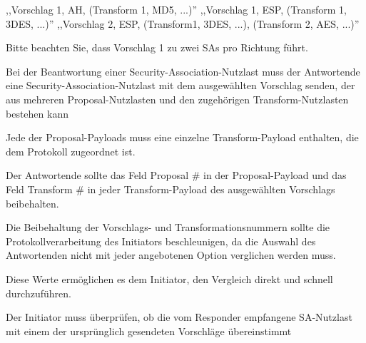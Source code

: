 \documentclass[a4paper]{article}
\begin{document}
\begin{multicols}{3}
\begin{itemize*}
\begin{itemize*}
                  \begin{itemize*}
                        \item ,,Vorschlag 1, AH, (Transform 1, MD5, ...)'' ,,Vorschlag 1, ESP, (Transform 1, 3DES, ...)'' ,,Vorschlag 2, ESP, (Transform1, 3DES, ...), (Transform 2, AES, ...)''
                  \end{itemize*}
                  \item Bitte beachten Sie, dass Vorschlag 1 zu zwei SAs pro Richtung führt.
            \end{itemize*}
            \item Bei der Beantwortung einer Security-Association-Nutzlast muss der Antwortende eine Security-Association-Nutzlast mit dem ausgewählten Vorschlag senden, der aus mehreren Proposal-Nutzlasten und den zugehörigen Transform-Nutzlasten bestehen kann
            \item Jede der Proposal-Payloads muss eine einzelne Transform-Payload enthalten, die dem Protokoll zugeordnet ist.
            \item Der Antwortende sollte das Feld Proposal \# in der Proposal-Payload und das Feld Transform \# in jeder Transform-Payload des ausgewählten Vorschlags beibehalten.
            \begin{itemize*}
                  \item Die Beibehaltung der Vorschlags- und Transformationsnummern sollte die Protokollverarbeitung des Initiators beschleunigen, da die Auswahl des Antwortenden nicht mit jeder angebotenen Option verglichen werden muss.
                  \item Diese Werte ermöglichen es dem Initiator, den Vergleich direkt und schnell durchzuführen.
            \end{itemize*}
            \item Der Initiator muss überprüfen, ob die vom Responder empfangene SA-Nutzlast mit einem der ursprünglich gesendeten Vorschläge übereinstimmt
      \end{itemize*}


\end{multicols}
\end{document}
